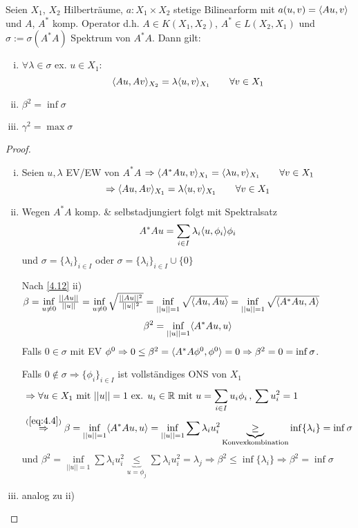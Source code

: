 \begin{satz} \label{4.13}
Seien $X_1$, $X_2$ Hilberträume, $a: X_1 \times X_2$ stetige Bilinearform mit $a(u,v) = \langle Au, v \rangle$ und $A$, $A^*$ komp. Operator d.h. $A \in K(X_1,X_2)$, $A^* \in L(X_2,X_1)$ und $\sigma := \sigma(A^*A)$ Spektrum von $A^*A$. Dann gilt:
\begin{enumerate}[i)]
	\item $\forall \lambda \in \sigma$ ex. $u \in X_1$:
	\[
		\langle Au, Av \rangle_{X_2} = \lambda \langle u, v \rangle_{X_1} \qquad \forall v \in X_1
	\]
	\item $\beta^2 = \inf \sigma$
	\item $\gamma^2 = \max \sigma$
\end{enumerate}
\begin{proof}
\begin{enumerate}[i)]
\item Seien $u, \lambda$ EV/EW von $A^*A$ $\Rightarrow \langle A^*Au, v \rangle_{X_1} = \langle \lambda u, v \rangle_{X_1} \qquad \forall v \in X_1$
\[
	\Rightarrow \langle Au, Av \rangle_{X_1} = \lambda \langle u, v \rangle_{X_1} \qquad \forall v \in X_1
\]
\item Wegen $A^*A$ komp. \& selbstadjungiert folgt mit Spektralsatz
\[
	A^*Au = \sum\limits_{i \in I} \lambda_i \dotp{u}{\phi_i}\phi_i
\]
und $\sigma = \{\lambda_i\}_{i \in I}$ oder $\sigma = \{\lambda_i\}_{i \in I} \cup \{0\}$

Nach \ref{4.12} ii) $\beta = \inf\limits_{u \neq 0} \frac{||Au||}{||u||} = \inf\limits_{u \neq 0} \sqrt{\frac{||Au||^2}{||u||^2}} = \inf\limits_{||u|| = 1} \sqrt{\langle Au, Au \rangle} = \inf\limits_{||u||=1} \sqrt{\langle A^*Au, A \rangle}$
\begin{align} \label{eq:4.4}
\beta^2 = \inf\limits_{||u||=1} \langle A^*Au, u \rangle
\end{align}
Falls $0 \in \sigma$ mit EV $\phi^0 \Rightarrow 0 \leq \beta^2 = \dotp{A^*A\phi^0}{\phi^0} = 0 \Rightarrow \beta^2 = 0 = \inf \sigma$.

Falls $0 \not\in \sigma \Rightarrow \{\phi_i\}_{i \in I}$ ist vollständiges ONS von $X_1$
\begin{align*}
	&\Rightarrow \forall u \in X_1 \text{ mit } ||u||=1 \text{ ex. } u_i \in \R \text{ mit } u = \sum\limits_{i \in I} u_i \phi_i \, , \, \sum u_i^2 = 1 \\
	&\overset{(\ref{eq:4.4})}{\Rightarrow} \beta = \inf\limits_{||u||=1} \dotp{A^*Au}{u} = \inf\limits_{||u||=1} \sum \lambda_i u_i^2  \underbrace{\geq}_{\text{Konvexkombination}} \inf \{\lambda_i\} = \inf \sigma
\end{align*}
und $\beta^2 = \inf\limits_{||u||=1} \sum \lambda_i u_i^2 \underbrace{\leq}_{u = \phi_j} \sum \lambda_i u_i^2 = \lambda_j \Rightarrow \beta^2 \leq \inf \{\lambda_i\} \Rightarrow \beta^2 = \inf \sigma$
\item analog zu ii)
\end{enumerate}
\end{proof}
\end{satz}

